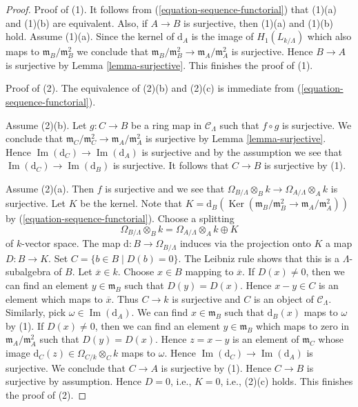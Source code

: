 \documentclass{stacks-project}
\theoremstyle{plain}
\theoremstyle{definition}
\theoremstyle{remark}
\numberwithin{equation}{subsection}
\def\Ker{\mathop{\mathrm{Ker}}}
\def\Im{\mathop{\mathrm{Im}}}
\begin{document}
\begin{proof}
Proof of (1). It follows from (\ref{equation-sequence-functorial})
that (1)(a) and (1)(b) are equivalent. Also, if
$A \to B$ is surjective, then (1)(a) and (1)(b) hold. Assume (1)(a).
Since the kernel of $\text{d}_A$ is the image of
$H_1(L_{k/\Lambda})$ which also maps to
$\mathfrak m_B/\mathfrak m_B^2$ we conclude that
$\mathfrak m_B/\mathfrak m_B^2 \to \mathfrak m_A/\mathfrak m_A^2$
is surjective. Hence $B \to A$ is surjective by
Lemma \ref{lemma-surjective}. This finishes the proof of (1).

\medskip\noindent
Proof of (2). The equivalence of (2)(b) and (2)(c) is immediate from
(\ref{equation-sequence-functorial}).

\medskip\noindent
Assume (2)(b). Let $g : C \to B$ be a ring map in $\mathcal{C}_\Lambda$
such that $f \circ g$ is surjective. We conclude that
$\mathfrak m_C/\mathfrak m_C^2 \to \mathfrak m_A/\mathfrak m_A^2$
is surjective by
Lemma \ref{lemma-surjective}.
Hence
$\Im(\text{d}_C) \to \Im(\text{d}_A)$ is surjective
and by the assumption we see that
$\Im(\text{d}_C) \to \Im(\text{d}_B)$ is surjective.
It follows that $C \to B$ is surjective by (1).

\medskip\noindent
Assume (2)(a). Then $f$ is surjective and we see that
$\Omega_{B/\Lambda} \otimes_B k \to \Omega_{A/\Lambda} \otimes_A k$
is surjective. Let $K$ be the kernel. Note that
$K = \text{d}_B(\Ker(\mathfrak m_B/\mathfrak m_B^2 \to
\mathfrak m_A/\mathfrak m_A^2))$ by (\ref{equation-sequence-functorial}).
Choose a splitting
$$
\Omega_{B/\Lambda} \otimes_B k =
\Omega_{A/\Lambda} \otimes_A k \oplus K
$$
of $k$-vector space. The map $\text{d} : B \to \Omega_{B/\Lambda}$
induces via the projection onto $K$ a map $D : B \to K$. Set
$C = \{b \in B \mid D(b) = 0\}$. The Leibniz rule shows that this is
a $\Lambda$-subalgebra of $B$. Let $\overline{x} \in k$. Choose $x \in B$
mapping to $\overline{x}$. If $D(x) \not = 0$, then we can find an element
$y \in \mathfrak m_B$ such that $D(y) = D(x)$. Hence $x - y \in C$ is
an element which maps to $\overline{x}$. Thus $C \to k$ is surjective
and $C$ is an object of $\mathcal{C}_\Lambda$. Similarly, pick
$\omega \in \Im(\text{d}_A)$. We can find $x \in \mathfrak m_B$
such that $\text{d}_B(x)$ maps to $\omega$ by (1). If $D(x) \not = 0$, then
we can find an element $y \in \mathfrak m_B$ which maps to zero
in $\mathfrak m_A/\mathfrak m_A^2$ such that $D(y) = D(x)$.
Hence $z = x - y$ is an element of $\mathfrak m_C$ whose
image $\text{d}_C(z) \in \Omega_{C/k} \otimes_C k$ maps to $\omega$.
Hence $\Im(\text{d}_C) \to \Im(\text{d}_A)$ is surjective.
We conclude that $C \to A$ is surjective by (1). Hence $C \to B$ is
surjective by assumption. Hence $D = 0$, i.e., $K = 0$, i.e., (2)(c) holds.
This finishes the proof of (2).


\end{proof}
\end{document}
